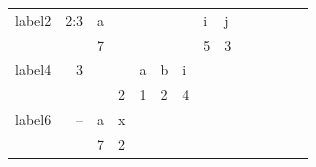 \documentclass{beamer}
\begin{document}
\begin{frame}
{\begin{tabular}{|p{1cm}|r||R{0.25cm}||R{0.25cm}|R{0.25cm}|R{0.25cm}|R{0.25cm}|R{0.25cm}|R{0.25cm}|R{0.25cm}|R{0.25cm}|R{0.25cm}|R{0.25cm}|R{0.25cm}|}
		label2 & 2:3     & a &   &   &   &   & i & j &   &   &   &   & \\ 
		       &         & 7 &   &   &   &   & 5 & 3 &   &   &   &   & \\ \hline
		label4 & 3       &   &   & a & b & i &   &   &   &   &   &   & \\ 
			   &         &   & 2 & 1 & 2 & 4 &   &   &   &   &   &   & \\ \hline
		label6 & --      & a & x &   &   &   &   &   &   &   &   &   & \\ 
			   &         & 7 & 2 &   &   &   &   &   &   &   &   &   & \\ \hline
	\end{tabular}}
\end{frame}



\end{document}
